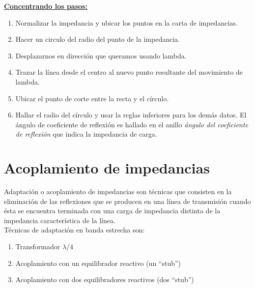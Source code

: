 \documentclass[
	12pt, %
	fleqn, %
	a4paper, %
	oneside, %
]{LegrandOrangeBook}
\begin{document}
\underline{\textbf{Concentrando los pasos:}}
\begin{enumerate}
\item Normalizar la impedancia y ubicar los puntos en la carta de impedancias.
\item Hacer un circulo del radio del punto de la impedancia.
\item Desplazarnos en dirección que queramos usando lambda.
\item Trazar la línea desde el centro al nuevo punto resultante del movimiento de lambda.
\item Ubicar el punto de corte entre la recta y el círculo.
\item Hallar el radio del círculo y usar la reglas inferiores para los demás datos. El ángulo de coeficiente de reflexión es hallado en el anillo \emph{ángulo del coeficiente de reflexión} que indica la impedancia de carga.
\end{enumerate}
\section{Acoplamiento de impedancias}
Adaptación o acoplamiento de impedancias son técnicas que consisten en la eliminación de las reflexiones que se producen en una línea de transmisión cuando ésta se encuentra terminada con una carga de impedancia distinta de la impedancia característica de la línea.\\
Técnicas de adaptación en banda estrecha son:
\begin{enumerate}
\item Transformador $\lambda/4$
\item Acoplamiento con un equilibrador reactivo (un ``stub'')
\item Acoplamiento con dos equilibradores reactivos (dos ``stub'')
\end{enumerate}
\end{document}
